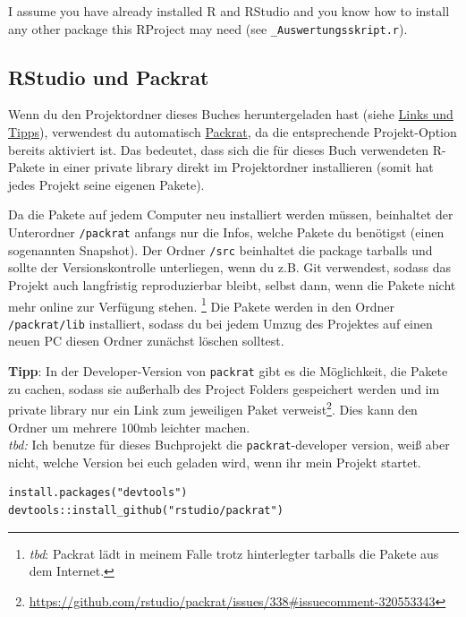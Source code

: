 \documentclass[]{book}
\let\rmarkdownfootnote\footnote%
\def\footnote{\protect\rmarkdownfootnote}
\theoremstyle{definition}
\theoremstyle{definition}
\theoremstyle{remark}
\begin{document}
I assume you have already installed R and RStudio and you know how to
install any other package this RProject may need (see
\texttt{\_Auswertungsskript.r}).

\hypertarget{rstudio-und-packrat}{\subsection*{RStudio und
Packrat}\label{rstudio-und-packrat}}

Wenn du den Projektordner dieses Buches heruntergeladen hast (siehe
\protect\hyperlink{links-und-tipps}{Links und Tipps}), verwendest du
automatisch \href{https://rstudio.github.io/packrat/}{Packrat}, da die
entsprechende Projekt-Option bereits aktiviert ist. Das bedeutet, dass
sich die für dieses Buch verwendeten R-Pakete in einer private library
direkt im Projektordner installieren (somit hat jedes Projekt seine
eigenen Pakete).

Da die Pakete auf jedem Computer neu installiert werden müssen,
beinhaltet der Unterordner \texttt{/packrat} anfangs nur die Infos,
welche Pakete du benötigst (einen sogenannten Snapshot). Der Ordner
\texttt{/src} beinhaltet die package tarballs und sollte der
Versionskontrolle unterliegen, wenn du z.B. Git verwendest, sodass das
Projekt auch langfristig reproduzierbar bleibt, selbst dann, wenn die
Pakete nicht mehr online zur Verfügung stehen. \footnote{\emph{tbd}:
  Packrat lädt in meinem Falle trotz hinterlegter tarballs die Pakete
  aus dem Internet.} Die Pakete werden in den Ordner
\texttt{/packrat/lib} installiert, sodass du bei jedem Umzug des
Projektes auf einen neuen PC diesen Ordner zunächst löschen solltest.

\textbf{Tipp}: In der Developer-Version von \texttt{packrat} gibt es die
Möglichkeit, die Pakete zu cachen, sodass sie außerhalb des Project
Folders gespeichert werden und im private library nur ein Link zum
jeweiligen Paket verweist\footnote{\url{https://github.com/rstudio/packrat/issues/338\#issuecomment-320553343}}.
Dies kann den Ordner um mehrere 100mb leichter machen.\\
\emph{tbd:} Ich benutze für dieses Buchprojekt die
\texttt{packrat}-developer version, weiß aber nicht, welche Version bei
euch geladen wird, wenn ihr mein Projekt startet.

\begin{verbatim}
install.packages("devtools")
devtools::install_github("rstudio/packrat")
\end{verbatim}
\end{document}
